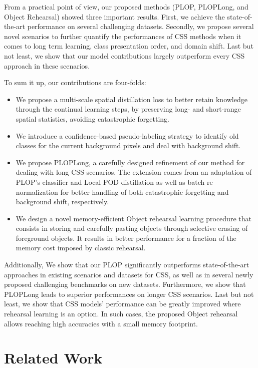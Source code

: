 From a practical point of view, our proposed methods (PLOP, PLOPLong, and Object Rehearsal) showed
three important results. First, we achieve the state-of-the-art performance on several challenging
datasets. Secondly, we propose several novel scenarios to further quantify the performances of \ac{CSS}
methods when it comes to long term learning, class presentation order, and domain shift. Last but not
least, we show that our model contributions largely outperform every \ac{CSS} approach in these
scenarios.

To sum it up, our contributions are four-folds:
\begin{itemize}
    \item We propose a multi-scale spatial distillation loss to better retain knowledge through the
          continual learning steps, by preserving long- and short-range spatial statistics, avoiding
          catastrophic forgetting.
    \item We introduce a confidence-based pseudo-labeling strategy to identify old classes for the
          current background pixels and deal with background shift.
    \item We propose PLOPLong, a carefully designed refinement of our method for dealing with long
          \ac{CSS} scenarios. The extension comes from an adaptation of PLOP's classifier and Local POD
          distillation as well as batch re-normalization for better handling of both catastrophic
          forgetting and background shift, respectively.
    \item We design a novel memory-efficient Object rehearsal learning procedure that consists in
          storing and carefully pasting objects through selective erasing of foreground objects. It
          results in better performance for a fraction of the memory cost imposed by classic
          rehearsal.
\end{itemize}

Additionally, We show that our PLOP significantly outperforms state-of-the-art approaches in existing
scenarios and datasets for \ac{CSS}, as well as in several newly proposed challenging benchmarks on new
datasets. Furthermore, we show that PLOPLong leads to superior performances on longer \ac{CSS} scenarios.
Last but not least, we show that \ac{CSS} models' performance can be greatly improved where rehearsal
learning is an option. In such cases, the proposed Object rehearsal allows reaching high accuracies
with a small memory footprint.

\section{Related Work}
\label{sec:seg_related}

